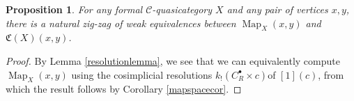 \documentclass[leqno]{article}
\numberwithin{equation}{subsection}
\theoremstyle{plain}   %
\newtheorem{prop}[equation]{Proposition}
\theoremstyle{remark}
\theoremstyle{plain}
\newcommand{\overcat}[2]{{\left(#1\downarrow #2\right)}}
\DeclareMathOperator{\Map}{Map}
\newcommand{\C}{\ensuremath{\mathcal{C}}}
\newcommand{\cellset}{\ensuremath{\widehat{\Theta[\mathcal{C}]}}}
\begin{document}
\begin{comment}
		The righthand vertical map comes from applying the nerve to the functor
		\[f:\overcat{\Delta}{\cellset_{\ast,\ast}(R^\bullet(c),X_{x,y})} \to \overcat{\mathcal{Y}_f(c)}{X_{x,y}}\]
		defined by the rule
		\[([n],R^n(c) \to X_{x,y}) \mapsto (R^n(c), R^n(c)\to X_{x,y}).\]
		To show that this functor induces a weak equivalence on nerves, we apply Quillen's theorem A.  Notice that for an object \	(y=(Y(c),Y(c)\to X_{x,y})\), the comma category \(\overcat{f}{y}\) is precisely
		\[\overcat{\Delta}{\mathcal{G}(c)(R^\bullet(c),Y(c))}=\overcat{\Delta}{\Map^\mathbf{sp}_{Y(c)}(\alpha,\omega)}.\]
		But by \cite{ds2}, the nerve of the category of elements of a simplicial set is weakly equivalent to that simplicial set, 	and since \(\Map^\mathbf{sp}_{Y(c)}(\alpha,\omega)\) was assumed to be contractible, the result follows.

		To see that the bottom map is an equivalence, it follows simply because \(C^\bullet(c) \to R^\bullet(c)\) is a Reedy 	trivial cofibration, so
		\[\cellset_{\ast,\ast}(R^\bullet(c),X_{x,y})  \to \cellset_{\ast,\ast}(C^\bullet(c),X_{x,y})\]
		is a weak equivalence.  Therefore, again by \cite{ds2}, the nerve of the category of elements of simplicial sets 	preserves weak equivalences.
	\end{proof}
\end{comment}
\begin{prop}\label{mapspacecomparison}
  For any formal \(\C\)-quasicategory \(X\) and any pair of vertices \(x,y\), there is a natural zig-zag of weak equivalences between \(\Map_X(x,y)\) and \(\mathfrak{C}(X)(x,y)\).
\end{prop}
\begin{proof}
	By Lemma \ref{resolutionlemma}, we see that we can equivalently compute \(\Map_X(x,y)\) using the cosimplicial resolutions \(k_!(C^\bullet_R\times c)\)of \([1](c)\), from which the result follows by Corollary \ref{mapspacecor}.
\end{proof}
\end{document}
